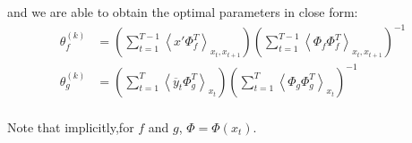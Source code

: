 and we are able to obtain the optimal parameters in close form:
\begin{align*}
  \theta_f^{(k)} &=
    \left(
      \sum_{t=1}^{T-1}{\left< x' \Phi_f^T \right>_{x_t,x_{t+1}}}
    \right)
    \left(
      \sum_{t=1}^{T-1}{\left< \Phi_f\Phi_f^T \right>_{x_t,x_{t+1}}}
    \right)^{-1}
  \\
  \theta_g^{(k)} &=
    \left(
      \sum_{t=1}^{T}{\left< \overline{y}_{t}\Phi_g^T \right>_{x_t}}
    \right)
    \left(
      \sum_{t=1}^{T}{\left<\Phi_g\Phi_g^T \right>_{x_t}}
    \right)^{-1}
    \\
\end{align*}

Note that implicitly,for $f$ and $g$, $\Phi=\Phi(x_t)$.

